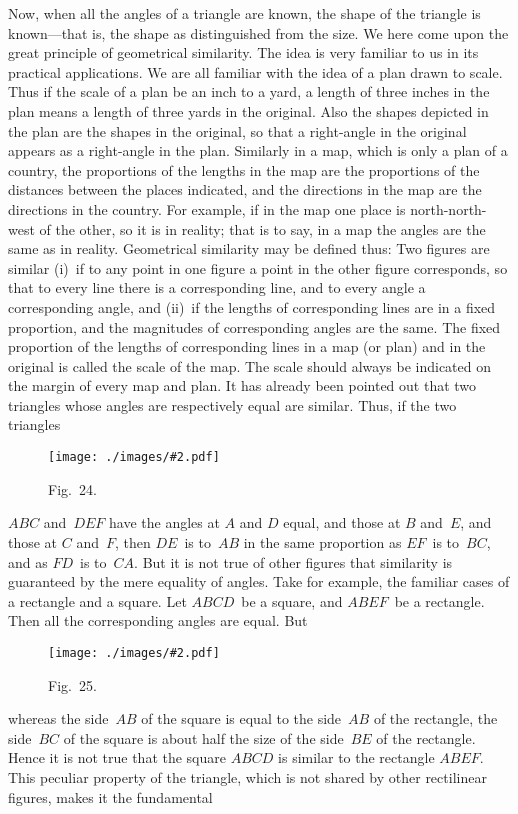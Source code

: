 \documentclass[12pt,leqno]{book}[2005/09/16]
\newcommand{\Graphic}[2]{%
  \phantomsection\label{fig:#2}%
  \texttt{[image: ./images/\#2.pdf]}%
}
\newcommand{\DefWidth}{4in}%
\newcommand{\Figure}[2][\DefWidth]{%
  \begin{figure}[hbt!]
    \centering
    \phantomsection\label{fig:#2}
    \Graphic{#1}{fig#2}
    \caption{Fig.~#2.}
  \end{figure}\ignorespaces%
}
\newcommand{\PageSep}[1]{\ignorespaces}
\begin{document}
Now, when all the angles of a triangle are
%
known, the shape of the triangle is known---that
is, the shape as distinguished from the
size. We here come upon the great principle
of geometrical similarity. The idea is very
familiar to us in its practical applications.
We are all familiar with the idea of a plan
drawn to scale. Thus if the scale of a plan
be an inch to a yard, a length of three inches
in the plan means a length of three yards in
the original. Also the shapes depicted in the
plan are the shapes in the original, so that a
right-angle in the original appears as a right-angle
in the plan. Similarly in a map, which
is only a plan of a country, the proportions
of the lengths in the map are the proportions
of the distances between the places indicated,
and the directions in the map are the directions
in the country. For example, if in the
map one place is north-north-west of the
other, so it is in reality; that is to say, in a
map the angles are the same as in reality.
\PageSep{178}
%
Geometrical similarity may be defined thus:
Two figures are similar (i)~if to any point
in one figure a point in the other figure
corresponds, so that to every line there is a
corresponding line, and to every angle a
corresponding angle, and (ii)~if the lengths
of corresponding lines are in a fixed proportion,
and the magnitudes of corresponding
angles are the same. The fixed proportion
of the lengths of corresponding lines in a map
(or plan) and in the original is called the scale
of the map. The scale should always be
indicated on the margin of every map and
plan. It has already been pointed out that
two triangles whose angles are respectively
equal are similar. Thus, if the two triangles
\Figure{24}
$ABC$ and~$DEF$ have the angles at $A$ and $D$
equal, and those at $B$ and~$E$, and those at $C$
and~$F$, then $DE$~is to~$AB$ in the same proportion
\PageSep{179}
as $EF$~is to~$BC$, and as $FD$~is to~$CA$.
But it is not true of other figures that similarity
is guaranteed by the mere equality of
angles. Take for example, the familiar cases
of a rectangle and a square. Let $ABCD$~be
a square, and $ABEF$~be a rectangle. Then
all the corresponding angles are equal. But
\Figure[2.75in]{25}
whereas the side~$AB$ of the square is equal to
the side~$AB$ of the rectangle, the side~$BC$ of
the square is about half the size of the side~$BE$
of the rectangle. Hence it is not true
that the square $ABCD$ is similar to the rectangle
$ABEF$. This peculiar property of the
triangle, which is not shared by other rectilinear
figures, makes it the fundamental
\end{document}
